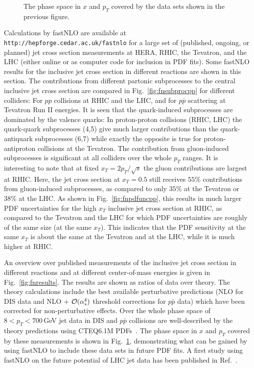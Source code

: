 \begin{figure}[!h]
\centerline{
}
  \caption{The phase space in $x$ and $p_T$
      covered by the data sets shown in the previous figure.
  \label{fig:fnresults2}}
\end{figure}

Calculations by fastNLO
are available at {\tt http://hepforge.cedar.ac.uk/fastnlo}
for a large set of (published, ongoing, or planned) 
jet cross section measurements at 
HERA, RHIC, the Tevatron, and the LHC
(either online or as computer code for inclusion in PDF fits).
%
Some fastNLO results for the inclusive jet cross section 
in different reactions are shown in this section.
%
The contributions from different partonic subprocesses
to the central inclusive jet cross section
are compared in Fig.~\ref{fig:fnsubprocpp} for different
colliders: 
For $pp$ collisions at RHIC and the LHC, 
and for $p\bar{p}$ scattering at Tevatron Run II energies.
It is seen that the quark-induced subprocesses are dominated
by the valence quarks:
In proton-proton collisions (RHIC, LHC)
the quark-quark subprocesses (4,5) give much larger 
contributions than the quark-antiquark subprocesses (6,7)
while exactly the opposite is true for proton-antiproton collisions
at the Tevatron.
%
The contribution from gluon-induced subprocesses is 
significant at all colliders over the whole $p_T$ ranges.
It is interesting to note that at fixed $x_T = 2 p_T/\sqrt{s}$
the gluon contributions are largest at RHIC.
Here, the jet cross section at 
$x_T = 0.5$ still receives $55\%$
contributions from gluon-induced subprocesses,
as compared to only $35\%$ at the Tevatron or $38\%$ at the LHC.
%
As shown in Fig.~\ref{fig:fnpdfuncpp}, this results in much larger
PDF uncertainties for the high $x_T$ inclusive jet cross section 
at RHIC, as compared to the Tevatron and the LHC for which
PDF uncertainties are roughly 
of the same size (at the same $x_T$).
This indicates that the PDF sensitivity at the same $x_T$
is about the same at the Tevatron and at the LHC, 
while it is much higher at RHIC.


An overview over published measurements of the inclusive
jet cross section in different reactions and at different
center-of-mass energies is given in Fig.~\ref{fig:fnresults}.
The results are shown as ratios of data over theory.
The theory calculations include the best available 
perturbative predictions (NLO for DIS data and NLO + 
${\cal O}(\alpha_s^4)$ threshold corrections for $p\bar{p}$ data)
which have been corrected for non-perturbative effects.
Over the whole phase space of $8 < p_T < 700$\,GeV
jet data in DIS and $p\bar{p}$ collisions are well-described
by the theory predictions using 
CTEQ6.1M PDFs~\cite{Pumplin:2002vw}.
%
The phase space in $x$ and $p_T$ covered 
by these measurements is shown in Fig.~\ref{fig:fnresults2},
demonstrating what can be gained by using fastNLO 
to include these data sets in future PDF fits.
A first study using fastNLO on the future potential
of LHC jet data has been published in Ref.~\cite{cmsptdrv2}.



